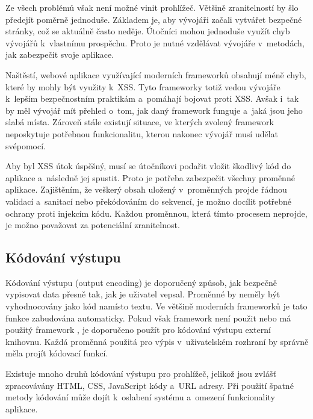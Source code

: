 \documentclass[11pt, conference, a4paper]{IEEEtran}
\begin{document}
Ze všech problémů však není možné vinit prohlížeč. Většině zranitelností by šlo předejít poměrně jednoduše. Základem je, aby vývojáři začali vytvářet bezpečné stránky, což se aktuálně často neděje. Útočníci mohou jednoduše využít chyb vývojářů k~vlastnímu prospěchu. Proto je nutné vzdělávat vývojáře v~metodách, jak zabezpečit svoje aplikace.~\cite{Grossman2007}


Naštěstí, webové aplikace využívající moderních frameworků obsahují méně chyb, které by mohly být využity k~XSS. Tyto frameworky totiž vedou vývojáře k~lepším bezpečnostním praktikám a~pomáhají bojovat proti XSS. Avšak i~tak by měl vývojář mít přehled o~tom, jak daný framework funguje a~jaká jsou jeho slabá místa. Zároveň stále existují situace, ve kterých zvolený framework neposkytuje potřebnou funkcionalitu, kterou nakonec vývojář musí udělat svépomocí.


Aby byl XSS útok úspěšný, musí se útočníkovi podařit vložit škodlivý kód do aplikace a~následně jej spustit. Proto je potřeba zabezpečit všechny proměnné aplikace. Zajištěním, že veškerý obsah uložený v~proměnných projde řádnou validací a~sanitací nebo překódováním do  sekvencí, je možno docílit potřebné ochrany proti injekcím kódu. Každou proměnnou, která tímto procesem neprojde, je možno považovat za potenciální zranitelnost.

\subsection{Kódování výstupu} %
Kódování výstupu (output encoding) je doporučený způsob, jak bezpečně vypisovat data přesně tak, jak je uživatel vepsal. Proměnné by neměly být vyhodnocovány jako kód namísto textu. Ve většině moderních frameworků je tato funkce zabudována automaticky. Pokud však framework není použit nebo má použitý framework , je doporučeno použít pro kódování výstupu externí knihovnu. Každá proměnná použitá pro výpis v~uživatelském rozhraní by správně měla projít kódovací funkcí.

Existuje mnoho druhů kódování výstupu pro prohlížeč, jelikož jsou zvlášť zpracovávány HTML, CSS, JavaScript  kódy a~URL adresy. Při použití špatné metody kódování může dojít k~oslabení systému a~omezení funkcionality aplikace. 
\end{document}
